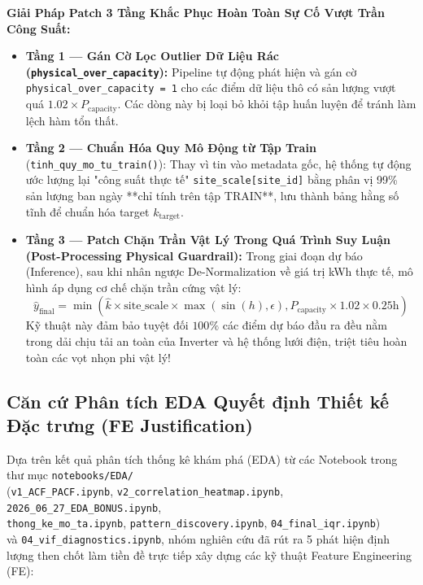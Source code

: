 \documentclass[12pt,a4paper]{article}
\begin{document}
\textbf{Giải Pháp Patch 3 Tầng Khắc Phục Hoàn Toàn Sự Cố Vượt Trần Công Suất:}
\begin{itemize}
    \item \textbf{Tầng 1 --- Gán Cờ Lọc Outlier Dữ Liệu Rác (\texttt{physical\_over\_capacity}):}  
    Pipeline tự động phát hiện và gán cờ \texttt{physical\_over\_capacity = 1} cho các điểm dữ liệu thô có sản lượng vượt quá $1.02 \times P_{\text{capacity}}$. Các dòng này bị loại bỏ khỏi tập huấn luyện để tránh làm lệch hàm tổn thất.
    \item \textbf{Tầng 2 --- Chuẩn Hóa Quy Mô Động từ Tập Train}\\(\texttt{tinh\_\allowbreak quy\_\allowbreak mo\_\allowbreak tu\_\allowbreak train()}):
    Thay vì tin vào metadata gốc, hệ thống tự động ước lượng lại "công suất thực tế" \texttt{site\_scale[site\_id]} bằng phân vị 99\% sản lượng ban ngày **chỉ tính trên tập TRAIN**, lưu thành bảng hằng số tĩnh để chuẩn hóa target $k_{\text{target}}$.
    \item \textbf{Tầng 3 --- Patch Chặn Trần Vật Lý Trong Quá Trình Suy Luận (Post-Processing Physical Guardrail):}  
    Trong giai đoạn dự báo (Inference), sau khi nhân ngược De-Normalization về giá trị kWh thực tế, mô hình áp dụng cơ chế chặn trần cứng vật lý:
    \begin{equation}
        \hat{y}_{\text{final}} = \min\left(\hat{k} \times \text{site\_scale} \times \max(\sin(h), \epsilon), P_{\text{capacity}} \times 1.02 \times 0.25\text{h}\right)
    \end{equation}
    Kỹ thuật này đảm bảo tuyệt đối $100\%$ các điểm dự báo đầu ra đều nằm trong dải chịu tải an toàn của Inverter và hệ thống lưới điện, triệt tiêu hoàn toàn các vọt nhọn phi vật lý!
\end{itemize}

\subsection[Căn cứ EDA Quyết định Thiết kế FE]{Căn cứ Phân tích EDA Quyết định Thiết kế Đặc trưng (FE Justification)}
Dựa trên kết quả phân tích thống kê khám phá (EDA) từ các Notebook trong thư mục \texttt{notebooks/EDA/}\\(\texttt{v1\_ACF\_PACF.ipynb}, \texttt{v2\_\allowbreak correlation\_\allowbreak heatmap.ipynb}, \texttt{2026\_06\_27\_\allowbreak EDA\_BONUS.ipynb},\\ \texttt{thong\_ke\_\allowbreak mo\_ta.ipynb}, \texttt{pattern\_\allowbreak discovery.ipynb}, \texttt{04\_final\_\allowbreak iqr.ipynb})\\ và \texttt{04\_vif\_\allowbreak diagnostics.ipynb}, nhóm nghiên cứu đã rút ra 5 phát hiện định lượng then chốt làm tiền đề trực tiếp xây dựng các kỹ thuật Feature Engineering (FE):
\end{document}

